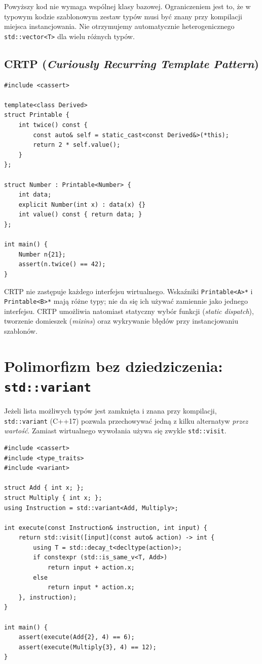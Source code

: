 Powyższy kod nie wymaga wspólnej klasy bazowej. Ograniczeniem jest to,
że w typowym kodzie szablonowym zestaw typów musi być znany przy
kompilacji miejsca instancjowania. Nie otrzymujemy automatycznie
heterogenicznego \texttt{std::vector<T>} dla wielu różnych typów.

\subsection{CRTP (\emph{Curiously Recurring Template Pattern})}

\begin{lstlisting}[caption={CRTP z metodą dostarczaną przez bazę (C++11); kompletny program.}]
#include <cassert>

template<class Derived>
struct Printable {
    int twice() const {
        const auto& self = static_cast<const Derived&>(*this);
        return 2 * self.value();
    }
};

struct Number : Printable<Number> {
    int data;
    explicit Number(int x) : data(x) {}
    int value() const { return data; }
};

int main() {
    Number n{21};
    assert(n.twice() == 42);
}
\end{lstlisting}

CRTP nie zastępuje każdego interfejsu wirtualnego. Wskaźniki
\texttt{Printable<A>*} i \texttt{Printable<B>*} mają różne typy;
nie da się ich używać zamiennie jako jednego interfejsu.
CRTP umożliwia natomiast statyczny wybór funkcji (\emph{static dispatch}),
tworzenie domieszek (\emph{mixins}) oraz wykrywanie błędów przy instancjowaniu szablonów.

\section{Polimorfizm bez dziedziczenia: \texttt{std::variant}}
\label{sec:cpp12-variant}

Jeżeli lista możliwych typów jest zamknięta i znana przy kompilacji,
\texttt{std::variant} (C++17) pozwala przechowywać jedną z kilku
alternatyw \emph{przez wartość}. Zamiast wirtualnego wywołania
używa się zwykle \texttt{std::visit}.

\begin{lstlisting}[caption={Zamknięty zbiór typów i std::visit (C++17); kompletny program.}]
#include <cassert>
#include <type_traits>
#include <variant>

struct Add { int x; };
struct Multiply { int x; };
using Instruction = std::variant<Add, Multiply>;

int execute(const Instruction& instruction, int input) {
    return std::visit([input](const auto& action) -> int {
        using T = std::decay_t<decltype(action)>;
        if constexpr (std::is_same_v<T, Add>)
            return input + action.x;
        else
            return input * action.x;
    }, instruction);
}

int main() {
    assert(execute(Add{2}, 4) == 6);
    assert(execute(Multiply{3}, 4) == 12);
}
\end{lstlisting}


